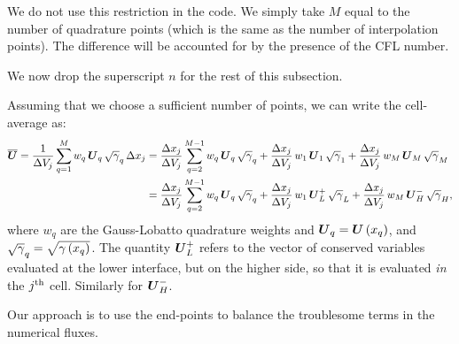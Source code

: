  We do not use this restriction in the code. We simply take $M$ equal to the number of quadrature points (which is the same as the number of interpolation points). The difference will be accounted for by the presence of the CFL number.

 We now drop the superscript $n$ for the rest of this subsection.

Assuming that we choose a sufficient number of points, we can write the cell-average as:
\begin{align}
    \overline{\boldsymbol{U}}=\frac{1}{\Delta V_{j}}\sum\limits_{q=1}^{M}w_{q}\,\boldsymbol{U}_{q}\,\sqrt{\gamma}_{q}\,\Delta x_{j}&=\frac{\Delta x_{j}}{\Delta V_{j}}\sum\limits_{q=2}^{M-1}w_{q}\,\boldsymbol{U}_{q}\,\sqrt{\gamma}_{q}+\frac{\Delta x_{j}}{\Delta V_{j}}\,w_{1}\,\boldsymbol{U}_{1}\,\sqrt{\gamma}_{1}+\frac{\Delta x_{j}}{\Delta V_{j}}\,w_{M}\,\boldsymbol{U}_{M}\,\sqrt{\gamma}_{M}\\
    &=\frac{\Delta x_{j}}{\Delta V_{j}}\sum\limits_{q=2}^{M-1}w_{q}\,\boldsymbol{U}_{q}\,\sqrt{\gamma}_{q}+\frac{\Delta x_{j}}{\Delta V_{j}}\,w_{1}\,\boldsymbol{U}^{+}_{L}\,\sqrt{\gamma}_{L}+\frac{\Delta x_{j}}{\Delta V_{j}}\,w_{M}\,\boldsymbol{U}^{-}_{H}\,\sqrt{\gamma}_{H},\label{Eq:CellAverageGL}
\end{align}
where $w_{q}$ are the Gauss-Lobatto quadrature weights and $\boldsymbol{U}_{q}=\boldsymbol{U}\left(x_{q}\right)$, and $\sqrt{\gamma}_{q}=\sqrt{\gamma\left(x_{q}\right)}$. The quantity $\boldsymbol{U}^{+}_{L}$ refers to the vector of conserved variables evaluated at the lower interface, but on the higher side, so that it is evaluated \textit{in} the $j^{\text{th}}$ cell. Similarly for $\boldsymbol{U}^{-}_{H}$.

Our approach is to use the end-points to balance the troublesome terms in the numerical fluxes.

